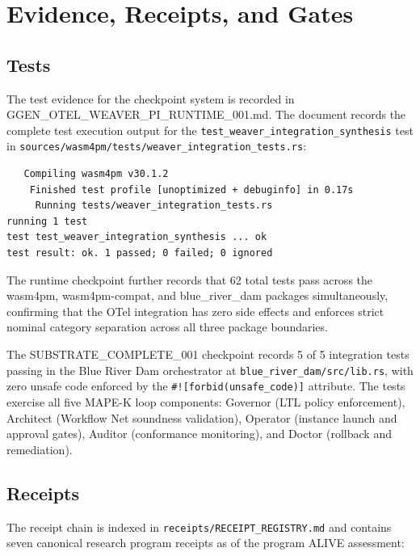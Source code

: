 \section{Evidence, Receipts, and Gates}
\label{sec:checkpoints-evidence}

\subsection{Tests}
\label{sec:checkpoints-evidence-tests}

The test evidence for the checkpoint system is recorded in GGEN\_OTEL\_WEAVER\_PI\_RUNTIME\_001.md.
The document records the complete test execution output for the \texttt{test\_weaver\_integration\_synthesis}
test in \texttt{sources/wasm4pm/tests/weaver\_integration\_tests.rs}:

\begin{verbatim}
   Compiling wasm4pm v30.1.2
    Finished test profile [unoptimized + debuginfo] in 0.17s
     Running tests/weaver_integration_tests.rs
running 1 test
test test_weaver_integration_synthesis ... ok
test result: ok. 1 passed; 0 failed; 0 ignored
\end{verbatim}

The runtime checkpoint further records that 62 total tests pass across the wasm4pm,
wasm4pm-compat, and blue\_river\_dam packages simultaneously, confirming that the OTel integration
has zero side effects and enforces strict nominal category separation across all three package
boundaries.

The SUBSTRATE\_COMPLETE\_001 checkpoint records 5 of 5 integration tests passing in the Blue River
Dam orchestrator at \texttt{blue\_river\_dam/src/lib.rs}, with zero unsafe code enforced by the
\texttt{\#![forbid(unsafe\_code)]} attribute. The tests exercise all five MAPE-K loop components:
Governor (LTL policy enforcement), Architect (Workflow Net soundness validation), Operator (instance
launch and approval gates), Auditor (conformance monitoring), and Doctor (rollback and remediation).

\subsection{Receipts}
\label{sec:checkpoints-evidence-receipts}

The receipt chain is indexed in \texttt{receipts/RECEIPT\_REGISTRY.md} and contains seven canonical
research program receipts as of the program ALIVE assessment:

